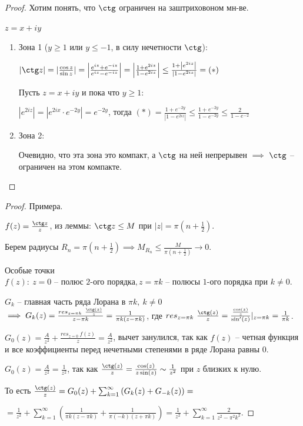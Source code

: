 \begin{proof}
    Хотим понять, что $\ctg$ ограничен на заштриховоном мн-ве.

    $z = x + iy$

    \begin{enumerate}
        \item {
            Зона 1 ($y \geq 1$ или $y \leq -1$, в силу нечетности $\ctg$):

            $|\ctg z| = |\frac{\cos z}{\sin z}| = \left|\frac{e^{iz} + e^{-iz}}{e^{iz} - e^{-iz}}\right| = \left| \frac{1 + e^{2iz}}{1 - e^{2iz}} \right| \leq  \frac{1 + \left|e^{2iz}\right|}{\left|1 - e^{2iz}\right|} = (*)$

            Пусть $z = x + iy$ и пока что $y \geq 1$:

            $|e^{2iz}| = |e^{2ix} \cdot e^{-2y}| = e^{-2y}$, тогда $(*) = \frac{1 + e^{-2y}}{|1 - e^{2iz}|} \leq \frac{1 + e^{-2y}}{1-e^{-2y}} \leq \frac{2}{1 - e^{-2}}$
        }
        \item {
            Зона 2:

            Очевидно, что эта зона это компакт, а $\ctg$ на ней непрерывен $\implies$ $\ctg$ -- ограничен на этом компакте.
        }
    \end{enumerate}
\end{proof}

\begin{proof}
    Примера.

    $f(z) = \frac{\ctg z}{z}$, из леммы: $\ctg z \leq M$ при $|z| = \pi (n + \frac{1}{2})$.

    Берем радиусы $R_n = \pi (n + \frac{1}{2}) \implies M_{R_n} \leq \frac{M}{\pi (n + \frac{1}{2})} \rightarrow 0$.

    Особые точки $f(z): \ z = 0 \text{ -- полюс 2-ого порядка}, z = \pi k \text{ -- полюсы 1-ого порядка при } k \neq 0$.

    $G_k$ -- главная часть ряда Лорана в $\pi k, \ k \neq 0$ $\implies G_k(z) = \frac{res_{z = \pi k} \ \frac{\ctg(z)}{z}}{z - \pi k} = \frac{1}{\pi k(z - \pi k)}$, где $res_{z = \pi k} \ \frac{\ctg(z)}{z} = \frac{\frac{\cos(z)}{z}}{\sin'(z)} |_{z = \pi k} = \frac{1}{\pi k}$.


    $G_0(z) = \frac{A}{z^2} + \frac{res_{z = 0} \ f(z)}{z} = \frac{A}{z^2}$, вычет занулился, так как $f(z)$ -- четная функция и все коэффициенты перед нечетными степенями в ряде Лорана равны $0$.

    $G_0(z) = \frac{A}{z^2} = \frac{1}{z^2}$, так как $\frac{\ctg(z)}{z} = \frac{\cos(z)}{z \sin(z)} \sim \frac{1}{z^2}$ при $z$ близких к нулю.

    То есть $\frac{\ctg(z)}{z} = G_0(z) + \sum_{k=1}^{\infty} \left(G_{k}(z) + G_{-k}(z)\right) =$

    $= \frac{1}{z^2} + \sum_{k=1}^{\infty} \left( \frac{1}{\pi k(z - \pi k)} + \frac{1}{\pi (-k) (z + \pi k)} \right) = \frac{1}{z^2} + \sum_{k=1}^{\infty} \frac{2}{z^2 - \pi^2 k^2}$.
\end{proof}

